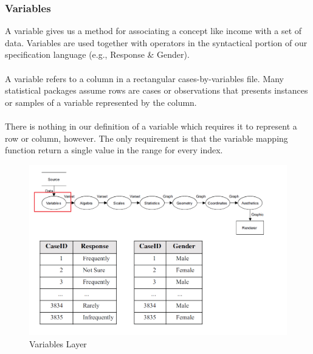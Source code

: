 \documentclass[12pt]{article}
\begin{document}
\subsubsection{Variables}
A variable gives us a method for associating a concept like income with a set of data. Variables
are used together with operators in the syntactical portion of our specification language (e.g., Response \& Gender). \\ \\
A variable refers to a column in a rectangular
cases-by-variables file. Many statistical packages assume rows are cases or observations that presents instances or samples of a variable represented
by the column. \\ \\
 There is nothing in our definition of a variable which requires it to represent a row or column, however. The only requirement is that
the variable mapping function return a single value in the range for every index.
\begin{figure}[h!]
\caption{Variables Layer}
\includegraphics[width=\textwidth]{pic/pre1}
\end{figure}
\newpage
\end{document}
